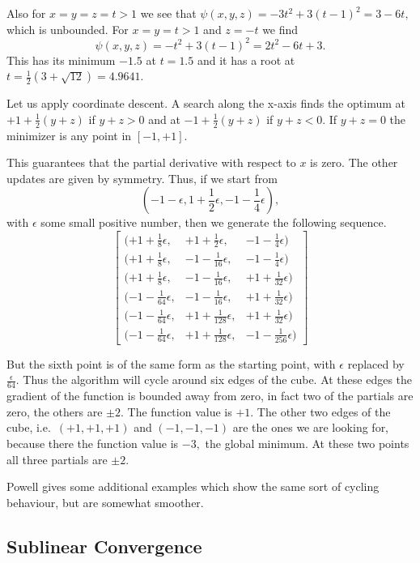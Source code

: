 \documentclass[
  12pt,
]{book}
\begin{document}
Also for \(x=y=z=t>1\) we see that \(\psi(x,y,z)=-3t^2+3(t-1)^2= 3-6t,\) which is unbounded. For \(x=y=t>1\) and \(z=-t\) we find
\[
\psi(x,y,z)=-t^2+3(t-1)^2=2t^2-6t+3.
\]
This has its minimum \(-1.5\) at \(t=1.5\) and it has a root at \(t=\frac{1}{2}(3+\sqrt{12})=4.9641.\)

Let us apply coordinate descent.
A search along the x-axis finds the optimum at \(+1+\frac{1}{2}(y+z)\) if \(y+z>0\) and at \(-1+\frac{1}{2}(y+z)\) if \(y+z<0\). If \(y+z=0\) the minimizer is any point in \([-1,+1]\).

This guarantees that the partial derivative with respect to \(x\) is zero.
The other updates are given by symmetry. Thus, if we start from
\[
(-1-\epsilon,1+{\frac{1}{2}}\epsilon,-1-{\frac{1}{4}}\epsilon),
\]
with \(\epsilon\) some small positive number, then we
generate the following sequence.
\[
\begin{bmatrix}
(+1+\frac{1}{8}\epsilon, &+1+\frac{1}{2}\epsilon,&-1-\frac{1}{4}\epsilon)\\
(+1+\frac{1}{8}\epsilon, &-1-\frac{1}{16}\epsilon,&-1-\frac{1}{4}\epsilon)\\
(+1+\frac{1}{8}\epsilon, &-1-\frac{1}{16}\epsilon,&+1+\frac{1}{32}\epsilon)\\
(-1-\frac{1}{64}\epsilon,&-1-\frac{1}{16}\epsilon,&+1+\frac{1}{32}\epsilon)\\
(-1-\frac{1}{64}\epsilon,&+1+\frac{1}{128}\epsilon,&+1+\frac{1}{32}\epsilon)\\
(-1-\frac{1}{64}\epsilon,&+1+\frac{1}{128}\epsilon,&-1-\frac{1}{256}\epsilon)
\end{bmatrix}
\]

But the sixth point is of the same form as the starting point, with \(\epsilon\) replaced by \(\frac{\epsilon}{64}.\) Thus the algorithm will
cycle around six edges of the cube. At these
edges the gradient of the function is bounded away from zero, in fact
two of the partials are zero, the others are \(\pm 2.\) The function value
is \(+1.\) The other two edges of the cube, i.e.~\((+1,+1,+1)\)
and \((-1,-1,-1)\) are the ones we are looking for, because there the
function value is \(-3,\) the global minimum. At these two points all three partials are \(\pm 2.\)

Powell gives some additional examples which show the same sort of cycling behaviour, but are somewhat smoother.

\hypertarget{blockrelaxation:somecounterexamples:sublinearconvergence}{%
\subsection{Sublinear Convergence}\label{blockrelaxation:somecounterexamples:sublinearconvergence}}
\end{document}
